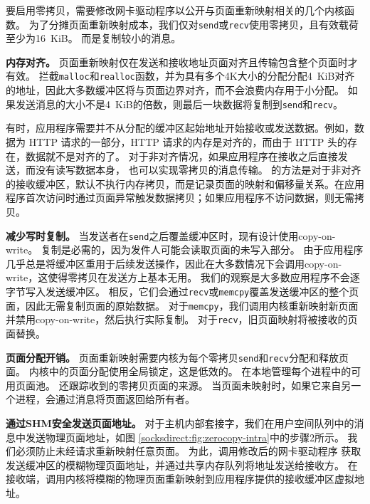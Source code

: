 

要启用零拷贝，需要修改网卡驱动程序以公开与页面重新映射相关的几个内核函数。
为了分摊页面重新映射成本，我们仅对\texttt {send}或\texttt {recv}使用零拷贝，且有效载荷至少为16~KiB。
而是复制较小的消息。

\textbf {内存对齐。}
页面重新映射仅在发送和接收地址页面对齐且传输包含整个页面时才有效。
\libipc{} 拦截\texttt {malloc}和\texttt {realloc}函数，并为具有多个4K大小的分配分配4~KiB对齐的地址，因此大多数缓冲区将与页面边界对齐，而不会浪费内存用于小分配。
如果发送消息的大小不是4~KiB的倍数，则最后一块数据将复制到\texttt {send}和\texttt {recv}。

有时，应用程序需要并不从分配的缓冲区起始地址开始接收或发送数据。例如，数据为 HTTP 请求的一部分，HTTP 请求的内存是对齐的，而由于 HTTP 头的存在，数据就不是对齐的了。
对于非对齐情况，如果应用程序在接收之后直接发送，而没有读写数据本身，\sys{} 也可以实现零拷贝的消息传输。\sys{} 的方法是对于非对齐的接收缓冲区，默认不执行内存拷贝，而是记录页面的映射和偏移量关系。在应用程序首次访问时通过页面异常触发数据拷贝；如果应用程序不访问数据，则无需拷贝。



\textbf{减少写时复制。}
当发送者在\texttt {send}之后覆盖缓冲区时，现有设计使用copy-on-write。
复制是必需的，因为发件人可能会读取页面的未写入部分。
由于应用程序几乎总是将缓冲区重用于后续发送操作，因此在大多数情况下会调用copy-on-write，这使得零拷贝在发送方上基本无用。
我们的观察是大多数应用程序不会逐字节写入发送缓冲区。 相反，它们会通过\texttt {recv}或\texttt {memcpy}覆盖发送缓冲区的整个页面，因此无需复制页面的原始数据。
对于\texttt {memcpy}，我们调用内核重新映射新页面并禁用copy-on-write，然后执行实际复制。
对于\texttt {recv}，旧页面映射将被接收的页面替换。


\textbf {页面分配开销。}
页面重新映射需要内核为每个零拷贝\texttt {send}和\texttt {recv}分配和释放页面。
内核中的页面分配使用全局锁定，这是低效的。 \libipc {}在本地管理每个进程中的可用页面池。
\libipc {}还跟踪收到的零拷贝页面的来源。
当页面未映射时，如果它来自另一个进程，\libipc {}会通过消息将页面返回给所有者。

\textbf {通过SHM安全发送页面地址。}
对于主机内部套接字，我们在用户空间队列中的消息中发送物理页面地址，如图 \ref {socksdirect:fig:zerocopy-intra}中的步骤2所示。
我们必须防止未经请求重新映射任意页面。
为此，\libipc {}调用修改后的网卡驱动程序
获取发送缓冲区的模糊物理页面地址，并通过共享内存队列将地址发送给接收方。
在接收端，\libipc {}调用内核将模糊的物理页面重新映射到应用程序提供的接收缓冲区虚拟地址。

